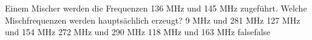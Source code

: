     {Einem Mischer werden die Frequenzen 136 MHz und 145 MHz zugeführt. Welche Mischfrequenzen werden hauptsächlich erzeugt?}
    {9 MHz und 281 MHz}
    {127 MHz und 154 MHz}
    {272 MHz und 290 MHz}
    {118 MHz und 163 MHz}
    {false}{false}